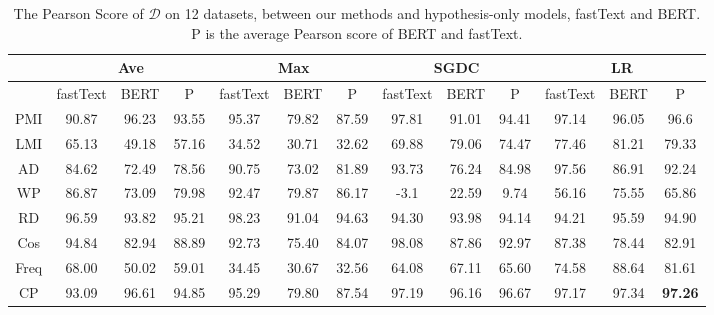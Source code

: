 \begin{table}[th]
\small
\centering
\begin{tabular}{ccccccccccccc}
\hline
     & \multicolumn{3}{c}{Ave}      & \multicolumn{3}{c}{Max}      & \multicolumn{3}{c}{SGDC}       & \multicolumn{3}{c}{LR}     \\ \hline
     & fastText & BERT & P     & fastText & BERT & P     & fastText & BERT & P     & fastText & BERT & P     \\ \hline
PMI  & 90.87       & 96.23   & 93.55 & 95.37       & 79.82   & 87.59 & 97.81       & 91.01   & 94.41 & 97.14       & 96.05   & 96.6  \\
LMI  & 65.13       & 49.18   & 57.16 & 34.52       & 30.71   & 32.62 & 69.88       & 79.06   & 74.47 & 77.46       & 81.21   & 79.33 \\
AD   & 84.62       & 72.49   & 78.56 & 90.75       & 73.02   & 81.89 & 93.73       & 76.24   & 84.98 & 97.56       & 86.91   & 92.24 \\
WP   & 86.87       & 73.09   & 79.98 & 92.47       & 79.87   & 86.17 & -3.1        & 22.59   & 9.74  & 56.16       & 75.55   & 65.86 \\
RD   & 96.59       & 93.82   & 95.21 & 98.23       & 91.04   & 94.63 & 94.30       & 93.98   & 94.14 & 94.21       & 95.59   & 94.90 \\
Cos  & 94.84       & 82.94   & 88.89 & 92.73       & 75.40   & 84.07 & 98.08       & 87.86   & 92.97 & 87.38       & 78.44   & 82.91 \\
Freq & 68.00       & 50.02   & 59.01 & 34.45       & 30.67   & 32.56 & 64.08       & 67.11   & 65.60 & 74.58       & 88.64   & 81.61 \\
CP   & 93.09       & 96.61   & 94.85 & 95.29       & 79.80   & 87.54 & 97.19       & 96.16   & 96.67 & 97.17       & 97.34   & \textbf{97.26} \\ \hline
\end{tabular}
\caption{\label{best_method} The Pearson Score of $\mathcal{D}$ on 12 datasets, between our methods and hypothesis-only models, fastText and BERT. 
P is the average Pearson score of BERT and fastText.}
\end{table}



